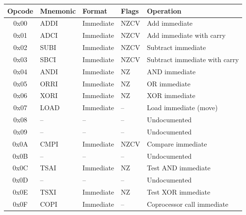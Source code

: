 \begin{table}[H]
	\centering
	\tiny
	\begin{tabular}{clllp{4cm}}
		\toprule
		\textbf{Opcode} & \textbf{Mnemonic} & \textbf{Format} & \textbf{Flags} & \textbf{Operation}            \\
		\midrule
		0x00            & ADDI              & Immediate       & NZCV           & Add immediate                 \\
		0x01            & ADCI              & Immediate       & NZCV           & Add immediate with carry      \\
		0x02            & SUBI              & Immediate       & NZCV           & Subtract immediate            \\
		0x03            & SBCI              & Immediate       & NZCV           & Subtract immediate with carry \\
		0x04            & ANDI              & Immediate       & NZ             & AND immediate                 \\
		0x05            & ORRI              & Immediate       & NZ             & OR immediate                  \\
		0x06            & XORI              & Immediate       & NZ             & XOR immediate                 \\
		0x07            & LOAD              & Immediate       & --             & Load immediate (move)         \\
		0x08            & --                & --              & --             & Undocumented                  \\
		0x09            & --                & --              & --             & Undocumented                  \\
		0x0A            & CMPI              & Immediate       & NZCV           & Compare immediate             \\
		0x0B            & --                & --              & --             & Undocumented                  \\
		0x0C            & TSAI              & Immediate       & NZ             & Test AND immediate            \\
		0x0D            & --                & --              & --             & Undocumented                  \\
		0x0E            & TSXI              & Immediate       & NZ             & Test XOR immediate            \\
		0x0F            & COPI              & Immediate       & --             & Coprocessor call immediate    \\

\end{tabular}
\end{table}

